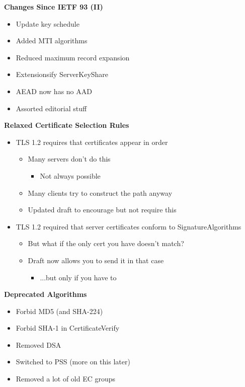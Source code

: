 \documentclass[helvetica]{seminar}
\newcommand{\heading}[1]{%
  \begin{center} 
    \large\bf 
    #1 
  \end{center} 
  \vspace{.4 in}}
\begin{document}
\begin{slide}
\heading{Changes Since IETF 93 (II)}

\begin{itemize}
\item Update key schedule
\item Added MTI algorithms
\item Reduced maximum record expansion
\item Extensionsify ServerKeyShare
\item AEAD now has no AAD
\item Assorted editorial stuff
\end{itemize}
\end{slide}


\begin{slide}
\heading{Relaxed Certificate Selection Rules}

\begin{itemize}
\item TLS 1.2 requires that certificates appear in order
  \begin{itemize}
  \item Many servers don't do this
    \begin{itemize}
    \item Not always possible
    \end{itemize}
  \item Many clients try to construct the path anyway
  \item Updated draft to encourage but not require this
  \end{itemize}

\item TLS 1.2 required that server certificates conform to SignatureAlgorithms
  \begin{itemize}
  \item But what if the only cert you have doesn't match?
  \item Draft now allows you to send it in that case 
    \begin{itemize}
    \item ...but only if you have to
    \end{itemize}
  \end{itemize}
\end{itemize}
\end{slide}


\begin{slide}
\heading{Deprecated Algorithms} 

\begin{itemize}
\item Forbid MD5 (and SHA-224)
\item Forbid SHA-1 in CertificateVerify
\item Removed DSA
\item Switched to PSS (more on this later)
\item Removed a lot of old EC groups
\end{itemize}

\end{slide}
\end{document}
